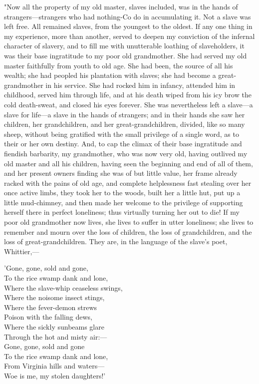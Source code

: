 "Now all the property of my old master, slaves included,
{\protect\hypertarget{180}{}{}}was in the hands of strangers---strangers
who had nothing-Co do in accumulating it. Not a slave was left free. All
remained slaves, from the youngest to the oldest. If any one thing in my
experience, more than another, served to deepen my conviction of the
infernal character of slavery, and to fill me with unutterable loathing
of slaveholders, it was their base ingratitude to my poor old
grandmother. She had served my old master faithfully from youth to old
age. She had been, the source of all his wealth; she had peopled his
plantation with slaves; she had become a great-grandmother in his
service. She had rocked him in infancy, attended him in childhood,
served him through life, and at his death wiped from his icy brow the
cold death-sweat, and closed his eyes forever. She was nevertheless left
a slave---a slave for life---a slave in the hands of strangers; and in
their hands she saw her children, her grandchildren, and her
great-grandchildren, divided, like so many sheep, without being
gratified with the small privilege of a single word, as to their or her
own destiny. And, to cap the climax of their base ingratitude and
fiendish barbarity, my grandmother, who was now very old, having
outlived my old master and all his children, having seen the beginning
and end of all of them, and her present owners finding she was of but
little value, her frame already racked with the pains of old age, and
complete helplessness fast stealing over her once active limbs, they
took her to the woods, built her a little hut, put up a little
mud-chimney, and then made her welcome to the privilege of supporting
herself there in perfect loneliness; thus virtually turning her out to
die! If my poor old grandmother now lives, she lives to suffer in utter
loneliness; she lives to remember and mourn over the loss of children,
the loss of grandchildren, and the loss of great-grandchildren. They
are, in the language of the slave's poet, Whittier,---

{\protect\hypertarget{181}{}{}}

{{'}Gone, gone, sold and gone,\\
To the rice swamp dank and lone,\\
Where the slave-whip ceaseless swings,\\
Where the noisome insect stings,\\
Where the fever-demon strews\\
Poison with the falling dews,\\
Where the sickly sunbeams glare\\
Through the hot and misty air:---\\
{Gone, gone, sold and gone}\\
{To the rice swamp dank and lone,}\\
{From Virginia hills and waters---}\\
{Woe is me, my stolen daughters!'}}

